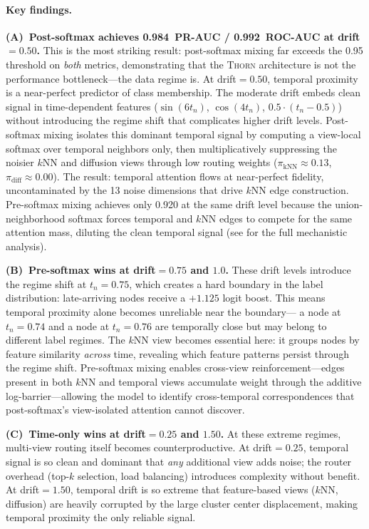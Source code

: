 \documentclass[11pt,a4paper]{article}
\newcommand{\thorn}{\textsc{Thorn}}
\begin{document}
\paragraph{Key findings.}
\textbf{(A)~Post-softmax achieves 0.984~PR-AUC / 0.992~ROC-AUC at
drift${}=0.50$.}
This is the most striking result: post-softmax mixing far exceeds the
0.95 threshold on \emph{both} metrics, demonstrating that the \thorn{}
architecture is not the performance bottleneck---the data regime is.
At drift${} = 0.50$, temporal proximity is a near-perfect predictor of
class membership.
The moderate drift embeds clean signal in time-dependent features
($\sin(6t_n)$, $\cos(4t_n)$, $0.5 \cdot (t_n - 0.5)$) without
introducing the regime shift that complicates higher drift levels.
Post-softmax mixing isolates this dominant temporal signal by computing
a view-local softmax over temporal neighbors only, then multiplicatively
suppressing the noisier $k$NN and diffusion views through low routing
weights ($\pi_{\text{kNN}} \approx 0.13$, $\pi_{\text{diff}} \approx
0.00$).
The result: temporal attention flows at near-perfect fidelity, uncontaminated
by the 13 noise dimensions that drive $k$NN edge construction.
Pre-softmax mixing achieves only 0.920 at the same drift level because
the union-neighborhood softmax forces temporal and $k$NN edges to compete
for the same attention mass, diluting the clean temporal signal
(see  for the full mechanistic analysis).

\textbf{(B)~Pre-softmax wins at drift${}=0.75$ and $1.0$.}
These drift levels introduce the regime shift at $t_n = 0.75$, which
creates a hard boundary in the label distribution: late-arriving nodes
receive a $+1.125$ logit boost.
This means temporal proximity alone becomes unreliable near the boundary---
a node at $t_n = 0.74$ and a node at $t_n = 0.76$ are temporally close
but may belong to different label regimes.
The $k$NN view becomes essential here: it groups nodes by feature
similarity \emph{across} time, revealing which feature patterns persist
through the regime shift.
Pre-softmax mixing enables cross-view reinforcement---edges present in
both $k$NN and temporal views accumulate weight through the additive
log-barrier---allowing the model to identify cross-temporal correspondences
that post-softmax's view-isolated attention cannot discover.

\textbf{(C)~Time-only wins at drift${}=0.25$ and $1.50$.}
At these extreme regimes, multi-view routing itself becomes
counterproductive.
At drift${} = 0.25$, temporal signal is so clean and dominant that
\emph{any} additional view adds noise; the router overhead (top-$k$
selection, load balancing) introduces complexity without benefit.
At drift${} = 1.50$, temporal drift is so extreme that feature-based
views ($k$NN, diffusion) are heavily corrupted by the large cluster
center displacement, making temporal proximity the only reliable signal.
\end{document}
